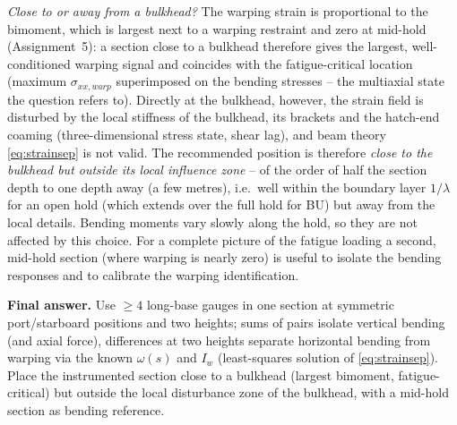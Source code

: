 \emph{Close to or away from a bulkhead?} The warping strain is proportional to the bimoment, which is largest next to a warping restraint and zero at mid-hold (Assignment~5): a section close to a bulkhead therefore gives the largest, well-conditioned warping signal and coincides with the fatigue-critical location (maximum $\sigma_{xx,warp}$ superimposed on the bending stresses -- the multiaxial state the question refers to). Directly at the bulkhead, however, the strain field is disturbed by the local stiffness of the bulkhead, its brackets and the hatch-end coaming (three-dimensional stress state, shear lag), and beam theory \eqref{eq:strainsep} is not valid. The recommended position is therefore \emph{close to the bulkhead but outside its local influence zone} -- of the order of half the section depth to one depth away (a few metres), i.e.\ well within the boundary layer $1/\lambda$ for an open hold (which extends over the full hold for BU) but away from the local details. Bending moments vary slowly along the hold, so they are not affected by this choice. For a complete picture of the fatigue loading a second, mid-hold section (where warping is nearly zero) is useful to isolate the bending responses and to calibrate the warping identification.

\bigskip
\noindent\textbf{Final answer.} Use $\ge4$ long-base gauges in one section at symmetric port/starboard positions and two heights; sums of pairs isolate vertical bending (and axial force), differences at two heights separate horizontal bending from warping via the known $\omega(s)$ and $I_w$ (least-squares solution of \eqref{eq:strainsep}). Place the instrumented section close to a bulkhead (largest bimoment, fatigue-critical) but outside the local disturbance zone of the bulkhead, with a mid-hold section as bending reference.
